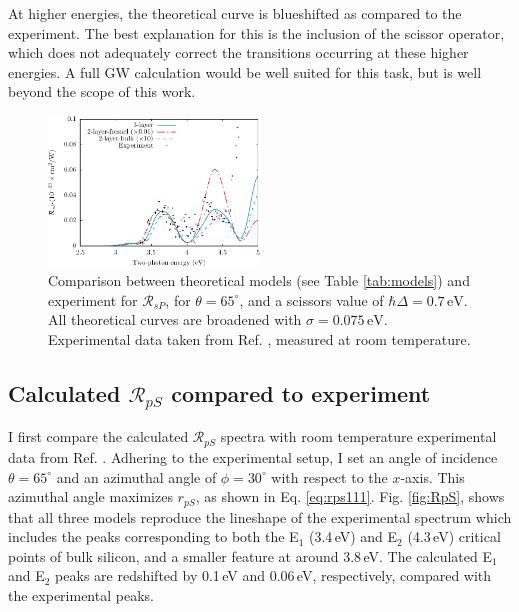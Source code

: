 At higher energies, the theoretical curve is blueshifted as compared to the
experiment. The best explanation for this is the inclusion of the scissor
operator, which does not adequately correct the transitions occurring at these
higher energies. A full GW calculation would be well suited for this task, but
is well beyond the scope of this work.

\begin{figure}[H]
\centering
\includegraphics[width=0.5\textwidth]{content/figures/fig-4_4_04}
\caption{Comparison between theoretical models (see Table \ref{tab:models}) and
experiment for $\mathcal{R}_{sP}$, for $\theta=65^{\circ}$, and a scissors
value of $\hbar\Delta = 0.7\,\text{eV}$. All theoretical curves are broadened
with $\sigma=0.075\,\text{eV}$. Experimental data taken from Ref.
\cite{mejiaPRB02}, measured at room temperature.}
\label{fig:RsP}
\end{figure}



\subsection{Calculated \texorpdfstring{$\mathcal{R}_{pS}$}{RpS} compared to 
experiment}\label{sec:1x1RpS}

I first compare the calculated $\mathcal{R}_{pS}$ spectra with room temperature
experimental data from Ref. \cite{mejiaPRB02}. Adhering to the experimental
setup, I set an angle of incidence $\theta=65^{\circ}$ and an azimuthal angle of
$\phi=30^\circ$ with respect to the $x$-axis. This azimuthal angle maximizes
$r_{pS}$, as shown in Eq. \eqref{eq:rps111}. Fig. \ref{fig:RpS}, shows that all
three models reproduce the lineshape of the experimental spectrum which includes
the peaks corresponding to both the E$_{1}$ (3.4\,eV) and E$_{2}$ (4.3\,eV)
critical points of bulk silicon, and a smaller feature at around 3.8\,eV. The
calculated E$_{1}$ and E$_{2}$ peaks are redshifted by 0.1\,eV and 0.06\,eV,
respectively, compared with the experimental peaks.


